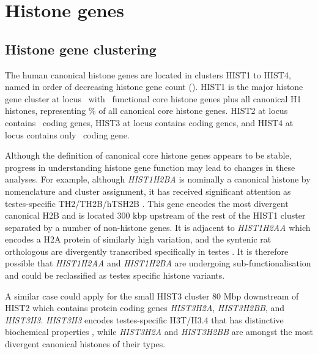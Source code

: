 \section{Histone genes}

  \subsection{Histone gene clustering}
    The human canonical histone genes are located in clusters HIST1 to HIST4,
    named in order of decreasing histone gene count ().
    HIST1 is the major histone gene cluster at locus~\HISTOneLocus{}
    with \CodingGenesInHISTOne{}~functional core histone genes plus all canonical H1 histones,
    representing
     \result{}\%
    of all canonical core histone genes.
    HIST2 at locus~\HISTTwoLocus{} contains \CodingGenesInHISTTwo{}~coding genes,
    HIST3 at locus \HISTThreeLocus{} contains \CodingGenesInHISTThree{} coding genes,
    and HIST4 at locus \HISTFourLocus{} contains only \CodingGenesInHISTFour{}~coding gene.

    Although the definition of canonical core histone genes appears to be stable,
    progress in understanding histone gene function may lead to changes in these analyses.
    For example, although \textit{HIST1H2BA} is nominally a canonical histone
    by nomenclature and cluster assignment,
    it has received significant attention as testes-specific TH2/TH2B/hTSH2B \citep{Zalensky2002,LiAusio2005,Shinagawa2014}.
    This gene encodes the most divergent canonical H2B
    and is located 300 kbp upstream of the rest of the HIST1 cluster
    separated by a number of non-histone genes.
    It is adjacent to \textit{HIST1H2AA} which encodes a H2A protein of similarly high variation,
    and the syntenic rat orthologous are divergently transcribed specifically in testes \citep{HuhChae1991}.
    It is therefore possible that \textit{HIST1H2AA} and \textit{HIST1H2BA}
    are undergoing sub-functionalisation and could be reclassified
    as testes specific histone variants.

    A similar case could apply for the small HIST3 cluster 80 Mbp downstream of HIST2
    which contains protein coding genes \textit{HIST3H2A}, \textit{HIST3H2BB}, and \textit{HIST3H3}.
    \textit{HIST3H3} encodes testes-specific H3T/H3.4
    that has distinctive biochemical properties \citep{WittExpCellRes1996,KurumizakaCOSB2013},
    while \textit{HIST3H2A} and \textit{HIST3H2BB} are amongst the most divergent canonical histones of their types.

